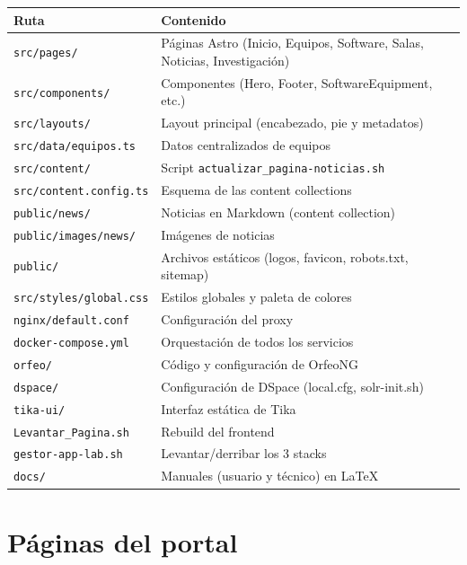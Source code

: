 \documentclass[12pt,a4paper]{report}
\begin{document}
\begin{center}
\small
\begin{tabular}{|l|l|}
\hline
\textbf{Ruta} & \textbf{Contenido} \\
\hline
\texttt{src/pages/} & Páginas Astro (Inicio, Equipos, Software, Salas, Noticias, Investigación) \\
\texttt{src/components/} & Componentes (Hero, Footer, SoftwareEquipment, etc.) \\
\texttt{src/layouts/} & Layout principal (encabezado, pie y metadatos) \\
\texttt{src/data/equipos.ts} & Datos centralizados de equipos \\
\texttt{src/content/} & Script \texttt{actualizar\_pagina-noticias.sh} \\
\texttt{src/content.config.ts} & Esquema de las content collections \\
\texttt{public/news/} & Noticias en Markdown (content collection) \\
\texttt{public/images/news/} & Imágenes de noticias \\
\texttt{public/} & Archivos estáticos (logos, favicon, robots.txt, sitemap) \\
\texttt{src/styles/global.css} & Estilos globales y paleta de colores \\
\texttt{nginx/default.conf} & Configuración del proxy \\
\texttt{docker-compose.yml} & Orquestación de todos los servicios \\
\texttt{orfeo/} & Código y configuración de OrfeoNG \\
\texttt{dspace/} & Configuración de DSpace (local.cfg, solr-init.sh) \\
\texttt{tika-ui/} & Interfaz estática de Tika \\
\texttt{Levantar\_Pagina.sh} & Rebuild del frontend \\
\texttt{gestor-app-lab.sh} & Levantar/derribar los 3 stacks \\
\texttt{docs/} & Manuales (usuario y técnico) en LaTeX \\
\hline
\end{tabular}
\end{center}

\section{Páginas del portal}
\end{document}
